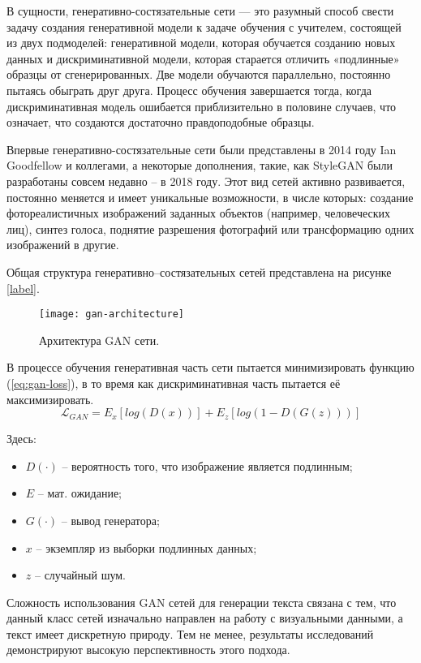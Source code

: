В сущности, генеративно-состязательные сети --- это разумный способ свести задачу создания генеративной модели к задаче обучения с учителем, состоящей из двух подмоделей: генеративной модели, которая обучается созданию новых данных и дискриминативной модели, которая старается отличить «подлинные» образцы от сгенерированных. Две модели обучаются параллельно, постоянно пытаясь обыграть друг друга. Процесс обучения завершается тогда, когда дискриминативная модель ошибается приблизительно в половине случаев, что означает, что создаются достаточно правдоподобные образцы.

Впервые генеративно-состязательные сети были представлены в 2014 году Ian Goodfellow и коллегами\cite{gan-introduction}, а некоторые дополнения, такие, как StyleGAN были разработаны совсем недавно -- в 2018 году\cite{gan-stylegan}. Этот вид сетей активно развивается, постоянно меняется и имеет уникальные возможности, в числе которых: создание фотореалистичных изображений заданных объектов (например, человеческих лиц), синтез голоса, поднятие разрешения фотографий\cite{gan-upscaling} или трансформацию одних изображений в другие.

Общая структура генеративно--состязательных сетей представлена на рисунке \ref{label}.
\begin{figure}[h]
	\centering
	\texttt{[image: gan-architecture]}
	\caption{Архитектура GAN сети.}
	\label{fig:gan-architecture}
\end{figure}

В процессе обучения генеративная часть сети пытается минимизировать функцию (\ref{eq:gan-loss}), в то время как дискриминативная часть пытается её максимизировать. 
\begin{equation}
\label{eq:gan-loss}
\mathcal{L}_{GAN} = E_x[log(D(x))] + E_z[log(1 - D(G(z)))]
\end{equation}

Здесь:
\begin{itemize}
	\item $D(\cdot)$ -- вероятность того, что изображение является подлинным;
	\item $E$ -- мат. ожидание;
	\item $G(\cdot)$ -- вывод генератора;
	\item $x$ -- экземпляр из выборки подлинных данных;
	\item $z$ -- случайный шум.
\end{itemize}

Сложность использования GAN сетей для генерации текста связана с тем, что данный класс сетей изначально направлен на работу с визуальными данными, а текст имеет дискретную природу. Тем не менее, результаты исследований\cite{zhang2017adversarial} демонстрируют высокую перспективность этого подхода.

